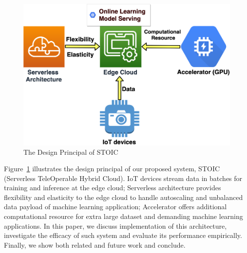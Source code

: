 \begin{figure}
    \centering
    \includegraphics[scale=0.27]{figures/edge}
    \caption{The Design Principal of STOIC }
    \label{fig:edge}
\end{figure}

Figure~\ref{fig:edge} illustrates the design principal of our proposed system, STOIC (Serverless TeleOperable Hybrid Cloud). IoT devices stream data in batches for training and inference at the edge cloud; Serverless architecture provides flexibility and elasticity to the edge cloud to handle autoscaling and unbalanced data payload of machine learning application; Accelerator offers additional computational resource for extra large dataset and demanding machine learning applications. In this paper, we discuss implementation of this architecture, investigate the efficacy of such system and evaluate its performance empirically. Finally, we show both related and future work and conclude.
